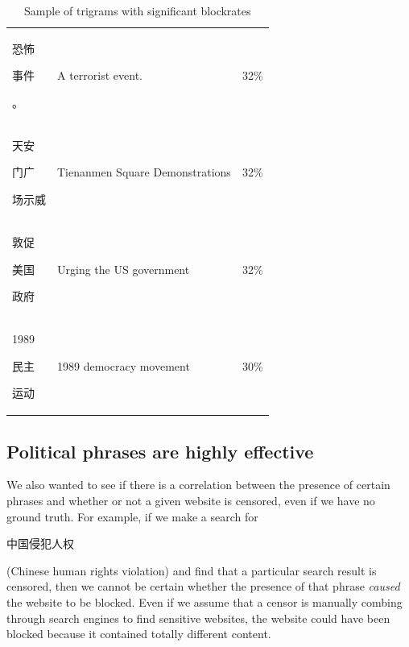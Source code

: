 \begin{table}[t]
\begin{center}
{\begin{tabular}{ l | l | c }
        \begin{CJK*}{UTF8}{gbsn}恐怖\end{CJK*} \begin{CJK*}{UTF8}{gbsn}事件\end{CJK*} \begin{CJK*}{UTF8}{gbsn}。\end{CJK*} & A terrorist event. & 32\% \\
        \begin{CJK*}{UTF8}{gbsn}天安\end{CJK*} \begin{CJK*}{UTF8}{gbsn}门广\end{CJK*} \begin{CJK*}{UTF8}{gbsn}场示威\end{CJK*} & Tienanmen Square Demonstrations & 32\% \\
        \begin{CJK*}{UTF8}{gbsn}敦促\end{CJK*} \begin{CJK*}{UTF8}{gbsn}美国\end{CJK*} \begin{CJK*}{UTF8}{gbsn}政府\end{CJK*} & Urging the US government & 32\% \\
        \begin{CJK*}{UTF8}{gbsn}1989\end{CJK*} \begin{CJK*}{UTF8}{gbsn}民主\end{CJK*} \begin{CJK*}{UTF8}{gbsn}运动\end{CJK*} & 1989 democracy movement & 30\% \\
      \end{tabular}}
  \end{center}
  \caption{\label{effective-trigrams}Sample of trigrams with
    significant blockrates}
\end{table}

\subsection{Political phrases are highly effective}
\label{phrases-eval}

We also wanted to see if there is a correlation between the
presence of certain phrases and whether or not a given website is
censored, even if we have no ground truth.  For example, if we make a search
for \begin{CJK*}{UTF8}{gbsn}中国侵犯人权\end{CJK*} (Chinese human
rights violation) and find that a particular search result is
censored, then we cannot be certain whether the presence of that phrase
\textit{caused} the website to be blocked. Even if we assume 
that a censor is manually combing through search engines to find
sensitive websites, the website could have been blocked because it
contained totally different content.

